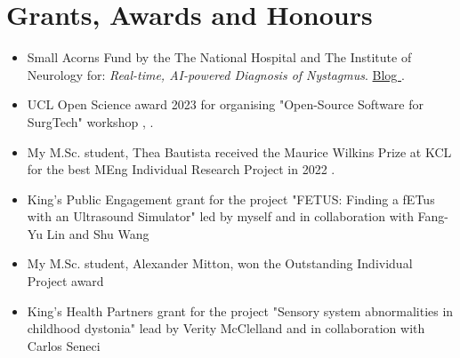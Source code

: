 \documentclass{mycv}
\begin{document}
\section{Grants, Awards and Honours}
\begin{itemize}

\item
Small Acorns Fund by the The National Hospital and The Institute of Neurology for: \textit{Real-time, AI-powered Diagnosis of Nystagmus}.
\href{https://www.nationalbrainappeal.org/nystagmus-diagnosis-software/}{Blog \faExternalLink*}
.

\item UCL Open Science award 2023 for organising "Open-Source Software for SurgTech" workshop \href{https://blogs.ucl.ac.uk/open-access/2023/10/26/open-science-scholarship-awards-winners/}{\faExternalLink*}, \href{https://github.com/oss-for-surgtech}{\faGithub*}
.

\item My M.Sc. student, Thea Bautista received the Maurice Wilkins Prize at KCL for the best MEng Individual Research Project in 2022 \href{https://twitter.com/_mxochicale/status/1564571097932402688}{\faExternalLink*} .

\item King's Public Engagement grant for the project "FETUS: Finding a fETus with an Ultrasound Simulator" led by myself and in collaboration with Fang-Yu Lin and Shu Wang \href{https://cai4cai.ml/post/2021-01-07-miguelpegrant/}{\faExternalLink*} 

\item My M.Sc. student, Alexander Mitton, won the Outstanding Individual Project award
 \href{https://www.kcl.ac.uk/news/mscmres-healthcare-technologies-award-student-prizes-for-outstanding-performance-and-contributions-to-student-life}{\faExternalLink*} 

\item King's Health Partners grant for the project "Sensory system abnormalities in childhood dystonia" lead by Verity McClelland and in collaboration with Carlos Seneci \href{https://kclpure.kcl.ac.uk/portal/en/persons/miguel-angel-perez-xochicale(cca72683-31b7-496a-8aeb-181fd9d6a8f3)/projects.html}{\faExternalLink*} 


\end{itemize}
\end{document}
